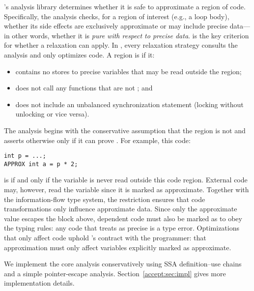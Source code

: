 \sysname's analysis library determines whether it is safe to approximate a
region of code.
Specifically, the \precisepurity analysis checks,
for a region of interest (e.g., a loop body), whether its side
effects are exclusively approximate or may include precise data---in other
words, whether it is \emph{pure with respect to precise data}.
%
\Precisepurity is the key criterion for whether a relaxation can
apply.  In
\sysname, every relaxation strategy consults the \precisepurity
analysis and only optimizes
\precisepure code.
%
A region is \precisepure if it:
\begin{itemize}
\item contains no stores to precise
variables that may be read outside the region;
\item does not call any functions that are not \precisepure; and
\item does not include an unbalanced synchronization statement (locking without
unlocking or vice versa).
\end{itemize}
The analysis begins with the conservative
assumption that the region is not \precisepure and asserts otherwise only if it
can prove \precisepurity.
%
For example, this code:
%
\begin{lstlisting}
int p = ...;
APPROX int a = p * 2;
\end{lstlisting}
%
is \precisepure if and only if the variable  is never read outside this
code region. External code may, however, read the variable  since it is
marked as approximate.
%
Together with the information-flow type system, the \precisepurity restriction
ensures that code transformations only influence approximate data.
Since only the approximate value  escapes the \precisepure block above,
dependent code must also be marked as  to obey the typing rules:
any code that treats  as precise is a type error.
Optimizations that only affect \precisepure code uphold \sysname's
contract with the programmer: that approximation must only affect variables
explicitly marked as approximate.

We implement the core \precisepurity analysis
conservatively using SSA definition--use chains and a simple pointer-escape
analysis.  Section~\ref{accept:sec:impl} gives more implementation details.

\iffalse  %
Each program-relaxation strategy uses the shared \precisepurity analysis to
identify \emph{relaxation-opportunity sites:} places where the transformation
can apply. When \sysname finds an opportunity site, it registers the site along
with any relevant parameters in its catalog of such sites. The autotuner then
uses this catalog to enable a subset of relaxation opportunities and set their
parameters.  Section~\ref{accept:sec:autotuner} describes the autotuning process in more detail.
\fi

